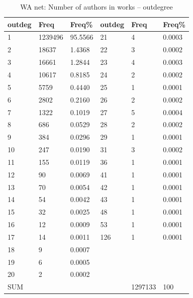 \documentclass[11pt]{article} %
\begin{document}
\begin{table}
\caption{WA net: \label{numpapout} Number of authors in works -- outdegree}
\renewcommand{\arraystretch}{0.9}
\begin{center}
\begin{tabular}{l|l|l||l|l|l}
outdeg&  	Freq&  	Freq\% &  	outdeg&   Freq &	Freq\%\\ \hline   
1&  	1239496&  	95.5566&  	21&  	4&  	0.0003\\
2&  	18637&  	1.4368&  	22&  	3&  	0.0002\\
3&  	16661&  	1.2844&  	23&  	4&  	0.0003\\
4&  	10617&  	0.8185&  	24&  	2&  	0.0002\\
5&  	5759&  	0.4440&  	25&  	1&  	0.0001\\
6&  	2802&  	0.2160&  	26&  	2&  	0.0002\\
7&  	1322&  	0.1019&  	27&  	5&  	0.0004\\
8&  	686&  	0.0529&  	28&  	2&  	0.0002\\
9&  	384&  	0.0296&  	29&  	1&  	0.0001\\
10&  	247&  	0.0190&  	31&  	3&  	0.0002\\
11&  	155&  	0.0119&  	36&  	1&  	0.0001\\
12&  	90&  	0.0069&  	41&  	1&  	0.0001\\
13&  	70&  	0.0054&  	42&  	1&  	0.0001\\
14&  	54&  	0.0042&  	43&  	1&  	0.0001\\
15&  	32&  	0.0025&  	48&  	1&  	0.0001\\
16&  	12&  	0.0009&  	53&  	1&  	0.0001\\
17&  	14&  	0.0011&  	126&  	1&  	0.0001\\
18&  	9&  	0.0007&  	  & 	 & 	\\
19&  	6&  	0.0005&  	 &	 &	\\
20&  	2&  	0.0002&  	&	 &	\\ \hline
SUM &     &              &       &  1297133 & 100  \\ \hline   
\end{tabular}
\end{center}
\end{table}
\end{document}

